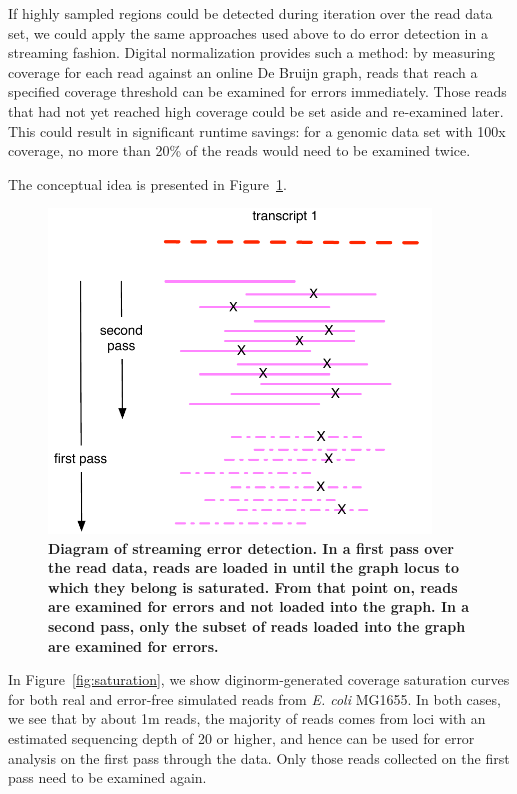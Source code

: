 \documentclass{article}
\begin{document}
If highly sampled regions could be detected during iteration over the
read data set, we could apply the same approaches used above to do
error detection in a streaming fashion.  Digital normalization
provides such a method: by measuring coverage for each read against an
online De Bruijn graph, reads that reach a specified coverage
threshold can be examined for errors immediately.  Those reads that
had not yet reached high coverage could be set aside and re-examined
later.  This could result in significant runtime savings: for a
genomic data set with 100x coverage, no more than 20\% of the reads
would need to be examined twice.

The conceptual idea is presented in Figure~\ref{fig:concept}.

\begin{figure}[!ht]
 \centerline{\includegraphics[width=4in]{./figures/graph-saturation}}
\caption{\bf Diagram of streaming error detection. In a first pass
over the read data, reads are loaded in until the graph locus to which
they belong is saturated.  From that point on, reads are examined for
errors and not loaded into the graph.  In a second pass, only the subset
of reads loaded into the graph are examined for errors.}
\label{fig:concept}
\end{figure}

In Figure~\ref{fig:saturation}, we show diginorm-generated coverage
saturation curves for both real and error-free simulated reads from
{\em E. coli} MG1655.  In both cases, we see that by about 1m reads,
the majority of reads comes from loci with an estimated sequencing
depth of 20 or higher, and hence can be used for error analysis on the
first pass through the data.  Only those reads collected on the first
pass need to be examined again.
\end{document}
